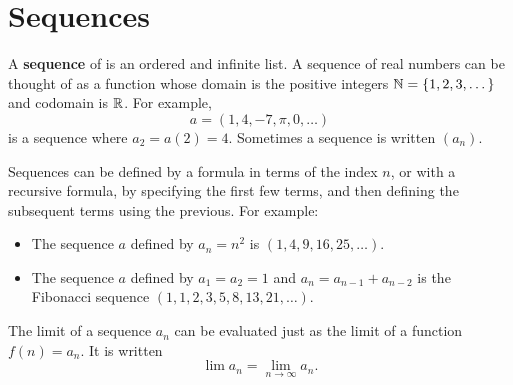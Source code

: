 \section{Sequences}

A \textbf{sequence} of is an ordered and infinite list. A sequence of real numbers can be thought of as a function whose domain is the positive integers $\mathbb{N}=\{1,2,3,\dots\}$ and codomain is $\mathbb{R}$. For example, 
$$a=(1,4,-7,\pi,0,\dots)$$
is a sequence where $a_2=a(2)=4$. Sometimes a sequence is written $(a_n)$.

Sequences can be defined by a formula in terms of the index $n$, or with a recursive formula, by specifying the first few terms, and then defining the subsequent terms using the previous. For example:

\begin{itemize}
\item The sequence $a$ defined by $a_n=n^2$ is $(1,4,9,16,25,\dots)$.
\item The sequence $a$ defined by $a_1=a_2=1$ and $a_n=a_{n-1}+a_{n-2}$ is the Fibonacci sequence $(1,1,2,3,5,8,13,21,\dots)$.
\end{itemize}

The limit of a sequence $a_n$ can be evaluated just as the limit of a function $f(n)=a_n$. It is written 
$$\lim a_n = \lim_{n\to\infty} a_n.$$